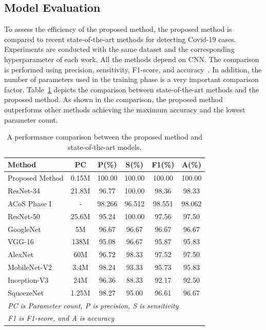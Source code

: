 \subsection{Model Evaluation}

To assess the efficiency of the proposed method,  the proposed method is compared to recent state-of-the-art methods for detecting Covid-19 cases. Experiments are conducted with the same dataset and the corresponding hyperparameter of each work. All the methods depend on CNN. The comparison is performed using precision, sensitivity, F1-score, and accuracy~\cite{hossin2015review}. In addition, the number of parameters used in the training phase is a very important comparison factor. Table~\ref{modelperf} depicts the comparison between state-of-the-art methods and the proposed method. As shown in the comparison, the proposed method outperforms other methods achieving the maximum accuracy and the lowest parameter count. 



\begin{table}[htbp]
\caption{ A performance comparison between the proposed method and state-of-the-art models.}
\begin{center}
\begin{tabular}{|l|c|c|c|c|c|}
\hline
\textbf{Method} & \textbf{PC} & \textbf{P(\%)}& \textbf{S(\%)}& \textbf{F1(\%)}& \textbf{A(\%)} \\
\hline
\hline
Proposed Method & 0.15M & 100.00 & 100.00 & 100.00 &100.00\\
\hline
ResNet-34~\cite{nayak2021application} & 21.8M & 96.77& 100.00 & 98.36 &98.33  \\
\hline
ACoS Phase I~\cite{chandra2021coronavirus}& - & 98.266 & 96.512 & 98.551 & 98.062 \\
\hline
ResNet-50~\cite{nayak2021application}& 25.6M& 95.24& 100.00& 97.56& 97.50 \\
\hline
GoogleNet~\cite{nayak2021application}& 5M &96.67& 96.67& 96.67& 96.67 \\
\hline
VGG-16~\cite{nayak2021application}& 138M& 95.08 & 96.67 & 95.87 &95.83\\
\hline
AlexNet~\cite{nayak2021application}& 60M& 96.72 &98.33 & 97.52& 97.50 \\
\hline
MobileNet-V2~\cite{nayak2021application} & 3.4M &98.24& 93.33& 95.73 & 95.83 \\
\hline
Inception-V3~\cite{nayak2021application}& 24M &96.36& 88.33 & 92.17& 92.50\\
\hline
SqueezeNet~\cite{nayak2021application}& 1.25M &98.27 &95.00& 96.61& 96.67 \\
\hline
\multicolumn{6}{l}{\textit{ PC is Parameter count, P is precision, S is sensitivity }}\\
\multicolumn{6}{l}{\textit{  F1 is F1-score, and A is accuracy }}\\
\hline
\end{tabular}
\label{modelperf}
\end{center}
\end{table}



